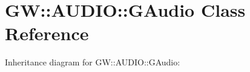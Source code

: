 \hypertarget{classGW_1_1AUDIO_1_1GAudio}{}\section{GW\+:\+:A\+U\+D\+IO\+:\+:G\+Audio Class Reference}
\label{classGW_1_1AUDIO_1_1GAudio}


Inheritance diagram for GW\+:\+:A\+U\+D\+IO\+:\+:G\+Audio\+:
